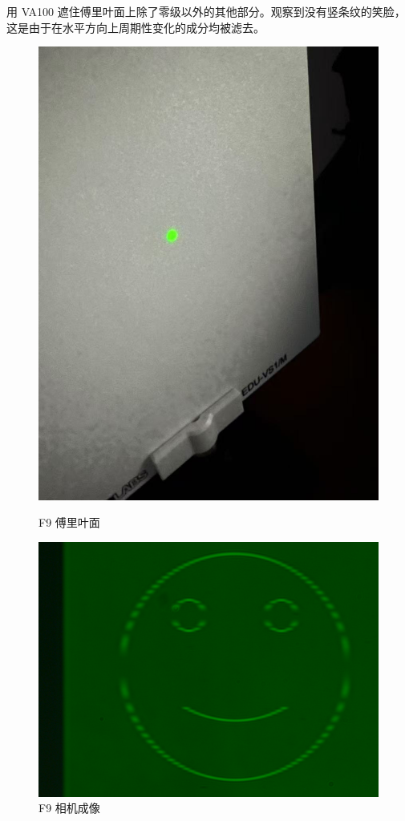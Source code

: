 \documentclass{ctexart}
\begin{document}
用 VA100 遮住傅里叶面上除了零级以外的其他部分。观察到没有竖条纹的笑脸，这是由于在水平方向上周期性变化的成分均被滤去。
\begin{figure}[H]
  \centering
  \begin{minipage}[b]{0.2\textwidth}
    \centering
    \includegraphics[width=\textwidth]{pictures/微信图片_20241017164828.jpg}
    \caption{F9 傅里叶面}
  \end{minipage}
  \hspace{0.1\textwidth} %
  \begin{minipage}[b]{0.3\textwidth}
    \centering
    \includegraphics[width=\textwidth]{pictures/F9-mask-Ex14.png}
    \caption{F9 相机成像}
  \end{minipage}
\end{figure}
\end{document}
